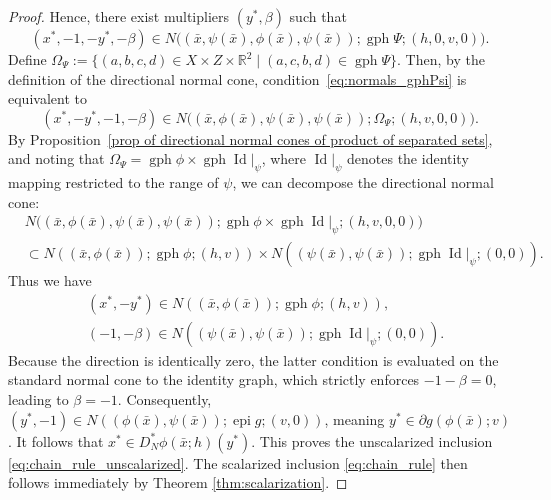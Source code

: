 \documentclass[12pt,twoside,reqno]{amsart}
\theoremstyle{definition}
\numberwithin{equation}{section}
\begin{document}
\begin{proof}
Hence, there exist multipliers \( (y^*, \beta) \) such that
\begin{equation}\label{eq:normals_gphPsi}
    (x^*, -1, -y^*, -\beta)
    \in N\bigl((\bar{x}, \psi(\bar{x}), \phi(\bar{x}), \psi(\bar{x}));
               \operatorname{gph} \Psi; (h, 0, v, 0)\bigr).
\end{equation}
Define $\Omega_\Psi
    := \{ (a, b, c, d) \in X \times Z \times \mathbb{R}^2 
        \mid (a, c, b, d) \in \operatorname{gph} \Psi \}$. 
Then, by the definition of the directional normal cone, condition~\eqref{eq:normals_gphPsi} is equivalent to
\begin{equation}\label{eq:normals_omega}
    (x^*, -y^*, -1, -\beta)
    \in N\bigl((\bar{x}, \phi(\bar{x}), \psi(\bar{x}), \psi(\bar{x}));
               \Omega_\Psi; (h, v, 0, 0)\bigr).
\end{equation}
By Proposition~\ref{prop of directional normal cones of product of separated sets},  
and noting that $\Omega_\Psi = \operatorname{gph} \phi \times \operatorname{gph} \operatorname{Id}|_{\psi}$, 
where \( \operatorname{Id}|_{\psi} \) denotes the identity mapping restricted to the range of \( \psi \),  
we can decompose the directional normal cone:
\begin{equation}\label{eq:decomposition of normal cone in chain rule}
    \begin{aligned}
    &N\bigl((\bar{x}, \phi(\bar{x}), \psi(\bar{x}), \psi(\bar{x}));
        \operatorname{gph} \phi \times 
        \operatorname{gph} \operatorname{Id}|_{\psi}; 
        (h, v, 0, 0)\bigr) \\
    &\subset
    N((\bar{x}, \phi(\bar{x})); \operatorname{gph} \phi; (h, v))
    \times
    N((\psi(\bar{x}), \psi(\bar{x})); 
      \operatorname{gph} \operatorname{Id}|_{\psi}; (0, 0)).
    \end{aligned}
\end{equation}
Thus we have
\begin{equation}
    \begin{split}
        &(x^*, -y^*) \in N((\bar{x}, \phi(\bar{x})); \operatorname{gph} \phi; (h, v)),\\
&(-1, -\beta) \in 
N((\psi(\bar{x}), \psi(\bar{x})); 
  \operatorname{gph} \operatorname{Id}|_{\psi}; (0, 0)). 
    \end{split}
\end{equation}
Because the direction is identically zero, the latter condition is evaluated on the standard normal cone to the identity graph, which strictly enforces $-1 - \beta = 0$, leading to \( \beta = -1 \).  
Consequently, $(y^*, -1) \in N((\phi(\bar{x}), \psi(\bar{x})); \operatorname{epi} g; (v, 0))$, meaning \( y^* \in \partial g(\phi(\bar{x}); v) \). It follows that $x^* \in D^*_N \phi(\bar{x}; h)(y^*)$. 
This proves the unscalarized inclusion \eqref{eq:chain_rule_unscalarized}. 
The scalarized inclusion \eqref{eq:chain_rule} then follows immediately by Theorem \ref{thm:scalarization}. 
\end{proof}
\end{document}
